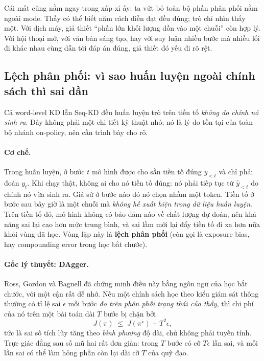 Cái mất cũng nằm ngay trong xấp xỉ ấy: ta vứt bỏ toàn bộ phần phân phối nằm ngoài mode. Thầy có thể biết năm cách diễn đạt đều đúng; trò chỉ nhìn thấy một. Với dịch máy, giả thiết ``phần lớn khối lượng dồn vào một chuỗi'' còn hợp lý. Với hội thoại mở, với văn bản sáng tạo, hay với suy luận nhiều bước mà nhiều lối đi khác nhau cùng dẫn tới đáp án đúng, giả thiết đó yếu đi rõ rệt.

\subsection{Lệch phân phối: vì sao huấn luyện ngoài chính sách thì sai dần}
\label{ssec:exposure_bias}

Cả word-level KD lẫn Seq-KD đều huấn luyện trò trên tiền tố \emph{không do chính nó sinh ra}. Đây không phải một chi tiết kỹ thuật nhỏ; nó là lý do tồn tại của toàn bộ nhánh on-policy, nên cần trình bày cho rõ.

\paragraph{Cơ chế.} Trong huấn luyện, ở bước $t$ mô hình được cho sẵn tiền tố đúng $y_{<t}$ và chỉ phải đoán $y_t$. Khi chạy thật, không ai cho nó tiền tố đúng: nó phải tiếp tục từ $\hat{y}_{<t}$ do chính nó vừa sinh ra. Giả sử ở bước nào đó nó chọn nhầm một token. Tiền tố ở bước sau bây giờ là một chuỗi mà \emph{không hề xuất hiện trong dữ liệu huấn luyện}. Trên tiền tố đó, mô hình không có bảo đảm nào về chất lượng dự đoán, nên khả năng sai lại cao hơn mức trung bình, và sai lầm mới lại đẩy tiền tố đi xa hơn nữa khỏi vùng đã học. Vòng lặp này là \textbf{lệch phân phối} (còn gọi là exposure bias, hay compounding error trong học bắt chước).

\paragraph{Gốc lý thuyết: DAgger.} Ross, Gordon và Bagnell \cite{ross2011dagger} đã chứng minh điều này bằng ngôn ngữ của học bắt chước, với một cận rất dễ nhớ. Nếu một chính sách học theo kiểu giám sát thông thường có tỉ lệ sai $\epsilon$ mỗi bước \emph{đo trên phân phối trạng thái của thầy}, thì chi phí của nó trên một bài toán dài $T$ bước bị chặn bởi
\[
J(\pi) \;\le\; J(\pi^\star) + T^2\epsilon ,
\]
tức là sai số tích lũy tăng theo \emph{bình phương} độ dài, chứ không phải tuyến tính. Trực giác đằng sau số mũ hai rất đơn giản: trong $T$ bước có cỡ $T\epsilon$ lần sai, và mỗi lần sai có thể làm hỏng phần còn lại dài cỡ $T$ của quỹ đạo.

